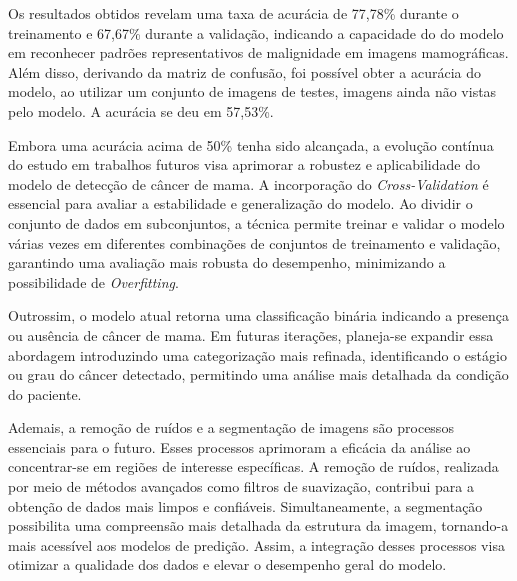 Os resultados obtidos revelam uma taxa de acurácia de 77,78\% durante o treinamento e 67,67\% durante a validação, indicando a capacidade do do modelo em reconhecer padrões representativos de malignidade em imagens mamográficas. Além disso, derivando da matriz de confusão, foi possível obter a acurácia do modelo, ao utilizar um conjunto de imagens de testes, imagens ainda não vistas pelo modelo. A acurácia se deu em 57,53\%. 

Embora uma acurácia acima de 50\% tenha sido alcançada, a evolução contínua do estudo em trabalhos futuros visa aprimorar a robustez e aplicabilidade do modelo de detecção de câncer de mama. A incorporação do \textit{Cross-Validation} é essencial para avaliar a estabilidade e generalização do modelo. Ao dividir o conjunto de dados em subconjuntos, a técnica permite treinar e validar o modelo várias vezes em diferentes combinações de conjuntos de treinamento e validação, garantindo uma avaliação mais robusta do desempenho, minimizando a possibilidade de \textit{Overfitting}.

Outrossim, o modelo atual retorna uma classificação binária indicando a presença ou ausência de câncer de mama. Em futuras iterações, planeja-se expandir essa abordagem introduzindo uma categorização mais refinada, identificando o estágio ou grau do câncer detectado, permitindo uma análise mais detalhada da condição do paciente.

Ademais, a remoção de ruídos e a segmentação de imagens são processos essenciais para o futuro. Esses processos aprimoram a eficácia da análise ao concentrar-se em regiões de interesse específicas. A remoção de ruídos, realizada por meio de métodos avançados como filtros de suavização, contribui para a obtenção de dados mais limpos e confiáveis. Simultaneamente, a segmentação possibilita uma compreensão mais detalhada da estrutura da imagem, tornando-a mais acessível aos modelos de predição. Assim, a integração desses processos visa otimizar a qualidade dos dados e elevar o desempenho geral do modelo.